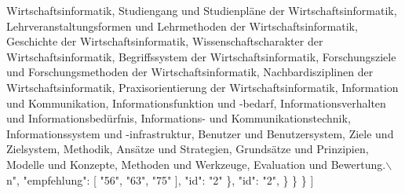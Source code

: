 \begin{DoxyCodeInclude}
{       Wirtschaftsinformatik, Studiengang und Studienpläne der Wirtschaftsinformatik, Lehrveranstaltungsformen und
       Lehrmethoden der Wirtschaftsinformatik, Geschichte der Wirtschaftsinformatik, Wissenschaftscharakter der
       Wirtschaftsinformatik, Begriffssystem der Wirtschaftsinformatik, Forschungsziele und Forschungsmethoden der
       Wirtschaftsinformatik, Nachbardisziplinen der Wirtschaftsinformatik, Praxisorientierung der Wirtschaftsinformatik,
       Information und Kommunikation, Informationsfunktion und -bedarf, Informationsverhalten und
       Informationsbedürfnis, Informations- und Kommunikationstechnik, Informationssystem und -infrastruktur, Benutzer und
       Benutzersystem, Ziele und Zielsystem, Methodik, Ansätze und Strategien, Grundsätze und Prinzipien, Modelle und
       Konzepte, Methoden und Werkzeuge, Evaluation und Bewertung.\(\backslash\)n"},
                    \textcolor{stringliteral}{"empfehlung"}: [
                        \textcolor{stringliteral}{"56"},
                        \textcolor{stringliteral}{"63"},
                        \textcolor{stringliteral}{"75"}
                    ],
                    \textcolor{stringliteral}{"id"}: \textcolor{stringliteral}{"2"}
                \},
                \textcolor{stringliteral}{"id"}: \textcolor{stringliteral}{"2"},
            \}
        \}
    \}
]
\end{DoxyCodeInclude}
 
